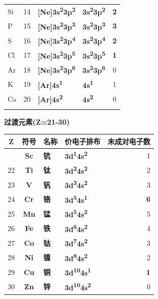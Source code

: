 \documentclass[a4paper,11pt]{ctexart}
\newcounter{none}
\newcommand{\箭}{\ensuremath{\rightarrow}}
\newcommand{\左箭}{\ensuremath{\leftarrow}}
\newcommand{\上箭}{\ensuremath{\uparrow}}
\newcommand{\下箭}{\ensuremath{\downarrow}}
\newcommand{\衡}{\ensuremath{\rightleftharpoons}}
\newcommand{\双箭}{\ensuremath{\leftrightarrow}}
\newcommand{\约等于}{\ensuremath{\approx}}
\newcommand{\小于等于}{\ensuremath{\leq}}
\newcommand{\大于等于}{\ensuremath{\geq}}
\newcommand{\不等于}{\ensuremath{\neq}}
\newcommand{\西格马}{\ensuremath{\sigma}}
\newcommand{\派}{\ensuremath{\pi}}
\begin{document}
{\begin{longtable}[]{@{}lcllc@{}}
Si & 14 & \textbf{{[}Ne{]}3s\textsuperscript{2}3p\textsuperscript{2}} & \textbf{3s\textsuperscript{2}3p\textsuperscript{2}} & \textbf{2} \\
P & 15 & \textbf{{[}Ne{]}3s\textsuperscript{2}3p\textsuperscript{3}} & \textbf{3s\textsuperscript{2}3p\textsuperscript{3}} & \textbf{3} \\
S & 16 & \textbf{{[}Ne{]}3s\textsuperscript{2}3p\textsuperscript{4}} & \textbf{3s\textsuperscript{2}3p\textsuperscript{4}} & \textbf{2} \\
Cl & 17 & \textbf{{[}Ne{]}3s\textsuperscript{2}3p\textsuperscript{5}} & \textbf{3s\textsuperscript{2}3p\textsuperscript{5}} & \textbf{1} \\
Ar & 18 & \textbf{{[}Ne{]}3s\textsuperscript{2}3p\textsuperscript{6}} & \textbf{3s\textsuperscript{2}3p\textsuperscript{6}} & 0 \\
K & 19 & \textbf{{[}Ar{]}4s\textsuperscript{1}} & \textbf{4s\textsuperscript{1}} & 1 \\
Ca & 20 & \textbf{{[}Ar{]}4s\textsuperscript{2}} & \textbf{4s\textsuperscript{2}} & 0 \\
& & & & \\
\end{longtable}
}

\textbf{过渡元素(Z=21-30)}

{\def\LTcaptype{none} %
\begin{longtable}[]{@{}ccllr@{}}
\toprule\noalign{}
Z & 符号 & 名称 & 价电子排布 & 未成对电子数 \\
\midrule\noalign{}
\endhead
\bottomrule\noalign{}
\endlastfoot
21 & \textbf{Sc} & \textbf{钪} & \textbf{3d\textsuperscript{1}4s\textsuperscript{2}} & 1 \\
22 & \textbf{Ti} & \textbf{钛} & \textbf{3d\textsuperscript{2}4s\textsuperscript{2}} & 2 \\
23 & \textbf{V} & \textbf{钒} & \textbf{3d\textsuperscript{3}4s\textsuperscript{2}} & 3 \\
24 & \textbf{Cr} & \textbf{铬} & \textbf{3d\textsuperscript{5}4s\textsuperscript{1}} & \textbf{6} \\
25 & \textbf{Mn} & \textbf{锰} & \textbf{3d\textsuperscript{5}4s\textsuperscript{2}} & 5 \\
26 & \textbf{Fe} & \textbf{铁} & \textbf{3d\textsuperscript{6}4s\textsuperscript{2}} & 4 \\
27 & \textbf{Co} & \textbf{钴} & \textbf{3d\textsuperscript{7}4s\textsuperscript{2}} & 3 \\
28 & \textbf{Ni} & \textbf{镍} & \textbf{3d\textsuperscript{8}4s\textsuperscript{2}} & 2 \\
29 & \textbf{Cu} & \textbf{铜} & \textbf{3d\textsuperscript{10}4s\textsuperscript{1}} & \textbf{1} \\
30 & \textbf{Zn} & \textbf{锌} & \textbf{3d\textsuperscript{10}4s\textsuperscript{2}} & 0 \\
\end{longtable}
}
\end{document}
